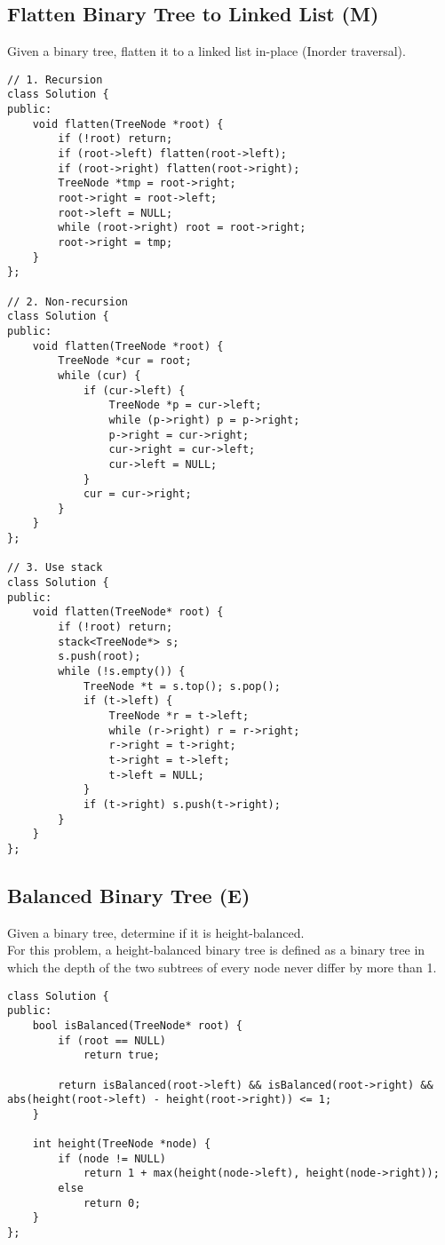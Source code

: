 \subsection{Flatten Binary Tree to Linked List (M)}
Given a binary tree, flatten it to a linked list in-place (Inorder traversal). \\

\begin{lstlisting}
// 1. Recursion
class Solution {
public:
    void flatten(TreeNode *root) {
        if (!root) return;
        if (root->left) flatten(root->left);
        if (root->right) flatten(root->right);
        TreeNode *tmp = root->right;
        root->right = root->left;
        root->left = NULL;
        while (root->right) root = root->right;
        root->right = tmp;
    }
};

// 2. Non-recursion
class Solution {
public:
    void flatten(TreeNode *root) {
        TreeNode *cur = root;
        while (cur) {
            if (cur->left) {
                TreeNode *p = cur->left;
                while (p->right) p = p->right;
                p->right = cur->right;
                cur->right = cur->left;
                cur->left = NULL;
            }
            cur = cur->right;
        }
    }
};

// 3. Use stack
class Solution {
public:
    void flatten(TreeNode* root) {
        if (!root) return;
        stack<TreeNode*> s;
        s.push(root);
        while (!s.empty()) {
            TreeNode *t = s.top(); s.pop();
            if (t->left) {
                TreeNode *r = t->left;
                while (r->right) r = r->right;
                r->right = t->right;
                t->right = t->left;
                t->left = NULL;
            }
            if (t->right) s.push(t->right);
        }
    }
};
\end{lstlisting}


\subsection{Balanced Binary Tree (E)}
Given a binary tree, determine if it is height-balanced.\\

For this problem, a height-balanced binary tree is defined as a binary tree in which the depth of the two subtrees of every node never differ by more than 1. \\
\begin{lstlisting}
class Solution {
public:
    bool isBalanced(TreeNode* root) {
        if (root == NULL)
            return true;
            
        return isBalanced(root->left) && isBalanced(root->right) && abs(height(root->left) - height(root->right)) <= 1;
    }
    
    int height(TreeNode *node) {
        if (node != NULL)
            return 1 + max(height(node->left), height(node->right));
        else
            return 0;
    }
};
\end{lstlisting}


